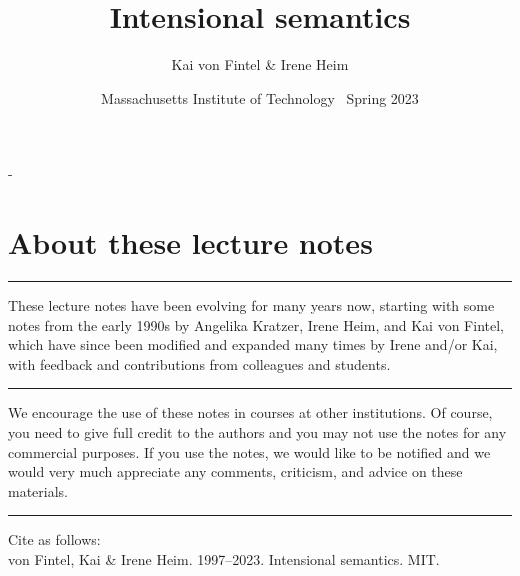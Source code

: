 \frontmatter

\title{Intensional semantics}
\author{Kai von Fintel \& Irene Heim}
\date{Massachusetts Institute of Technology \textbullet\ Spring 2023}

\pagestyle{empty}

\begin{titlingpage}
  \calccentering\unitlength %
  \begin{adjustwidth}{\unitlength}{-\unitlength}
    \par
    \vfill
    \begin{center}
      {\HUGE \thetitle}\par
      \vspace{4\baselineskip}
      {\LARGE\MakeUppercase{\theauthor}}\par
    \end{center}
  \end{adjustwidth} 
\end{titlingpage}
\cleardoublepage

\pagestyle{empty}
\titleVDQI

\clearpage
\vspace*{\fill}
\section*{About these lecture notes}

\plainbreak{1} 

These lecture notes have been evolving for many years now, starting with some
notes from the early 1990s by Angelika Kratzer, Irene Heim, and Kai von Fintel,
which have since been modified and expanded many times by Irene and/or Kai, with
feedback and contributions from colleagues and students.

\plainbreak{1} 

We encourage the use of these notes in courses at other institutions. Of course,
you need to give full credit to the authors and you may not use the notes for
any commercial purposes. If you use the notes, we would like to be notified and
we would very much appreciate any comments, criticism, and advice on these
materials.

\plainbreak{1}

Cite as follows: \\
von Fintel, Kai \& Irene Heim. 1997--2023. Intensional semantics. MIT.

